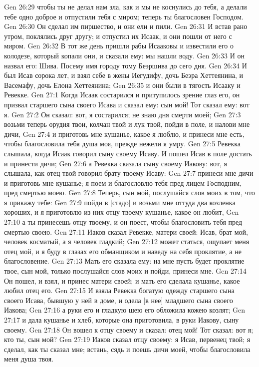Gen 26:29  чтобы ты не делал нам зла, как и мы не коснулись до тебя, а делали тебе одно доброе и отпустили тебя с миром; теперь ты благословен Господом.
Gen 26:30  Он сделал им пиршество, и они ели и пили.
Gen 26:31  И встав рано утром, поклялись друг другу; и отпустил их Исаак, и они пошли от него с миром.
Gen 26:32  В тот же день пришли рабы Исааковы и известили его о колодезе, который копали они, и сказали ему: мы нашли воду.
Gen 26:33  И он назвал его: Шива. Посему имя городу тому Беэршива до сего дня.
Gen 26:34  И был Исав сорока лет, и взял себе в жены Иегудифу, дочь Беэра Хеттеянина, и Васемафу, дочь Елона Хеттеянина;
Gen 26:35  и они были в тягость Исааку и Ревекке.
Gen 27:1  Когда Исаак состарился и притупилось зрение глаз его, он призвал старшего сына своего Исава и сказал ему: сын мой! Тот сказал ему: вот я.
Gen 27:2  Он сказал: вот, я состарился; не знаю дня смерти моей;
Gen 27:3  возьми теперь орудия твои, колчан твой и лук твой, пойди в поле, и налови мне дичи,
Gen 27:4  и приготовь мне кушанье, какое я люблю, и принеси мне есть, чтобы благословила тебя душа моя, прежде нежели я умру.
Gen 27:5  Ревекка слышала, когда Исаак говорил сыну своему Исаву. И пошел Исав в поле достать и принести дичи;
Gen 27:6  а Ревекка сказала сыну своему Иакову: вот, я слышала, как отец твой говорил брату твоему Исаву:
Gen 27:7  принеси мне дичи и приготовь мне кушанье; я поем и благословлю тебя пред лицем Господним, пред смертью моею.
Gen 27:8  Теперь, сын мой, послушайся слов моих в том, что я прикажу тебе:
Gen 27:9  пойди в [стадо] и возьми мне оттуда два козленка хороших, и я приготовлю из них отцу твоему кушанье, какое он любит,
Gen 27:10  а ты принесешь отцу твоему, и он поест, чтобы благословить тебя пред смертью своею.
Gen 27:11  Иаков сказал Ревекке, матери своей: Исав, брат мой, человек косматый, а я человек гладкий;
Gen 27:12  может статься, ощупает меня отец мой, и я буду в глазах его обманщиком и наведу на себя проклятие, а не благословение.
Gen 27:13  Мать его сказала ему: на мне пусть будет проклятие твое, сын мой, только послушайся слов моих и пойди, принеси мне.
Gen 27:14  Он пошел, и взял, и принес матери своей; и мать его сделала кушанье, какое любил отец его.
Gen 27:15  И взяла Ревекка богатую одежду старшего сына своего Исава, бывшую у ней в доме, и одела [в нее] младшего сына своего Иакова;
Gen 27:16  а руки его и гладкую шею его обложила кожею козлят;
Gen 27:17  и дала кушанье и хлеб, которые она приготовила, в руки Иакову, сыну своему.
Gen 27:18  Он вошел к отцу своему и сказал: отец мой! Тот сказал: вот я; кто ты, сын мой?
Gen 27:19  Иаков сказал отцу своему: я Исав, первенец твой; я сделал, как ты сказал мне; встань, сядь и поешь дичи моей, чтобы благословила меня душа твоя.
